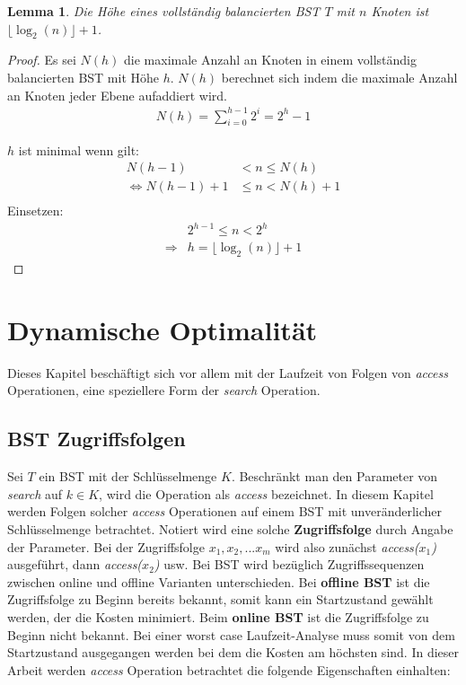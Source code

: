 \documentclass[a4paper,12pt]{article}
\begin{document}
\newtheorem{Lemma}{Lemma}[section]
\begin{Lemma} Die Höhe eines vollständig balancierten BST $T$ mit $n$ Knoten ist $ \lfloor \log_2{(n)} \rfloor + 1 $. 
\end{Lemma}
\begin{proof}
	
	Es sei $\mathit{N(h)}$ die maximale Anzahl an Knoten in einem vollständig balancierten BST mit Höhe $h$.
	$\mathit{N(h)}$  berechnet sich indem die maximale Anzahl an Knoten jeder Ebene aufaddiert wird.\\
	\begin{align*}
	\mathit{N(h)} = \sum\limits_{i=0}^{h-1} 2^i = 2^h - 1 
	\end{align*}
	
	\noindent	$h$ ist minimal wenn gilt:\\
	\begin{align*}
	\mathit{N(h-1)} &< n \leq \mathit{N(h)}\\
	\Leftrightarrow \mathit{N(h-1)} + 1 &\leq n < \mathit{N(h)} + 1\\
	\end{align*}
	Einsetzen:\\
	\begin{align*}
	&2^{h - 1} \leq n < 2^h\\
	\Rightarrow & h =  \lfloor \log_2{(n)} \rfloor + 1
	\end{align*}
	
\end{proof}


\newpage
\section{Dynamische Optimalität}
Dieses Kapitel beschäftigt sich vor allem mit der Laufzeit von Folgen von \textit{access} Operationen, eine speziellere Form der \textit{search} Operation.  
\subsection{BST Zugriffsfolgen}
Sei $T$ ein BST mit der Schlüsselmenge $K$. Beschränkt man den Parameter von \textit{search} auf $k \in K $, wird  die Operation als \textit{access} bezeichnet. In diesem Kapitel werden Folgen solcher \textit{access} Operationen auf einem BST mit unveränderlicher Schlüsselmenge betrachtet. Notiert wird eine solche \textbf{Zugriffsfolge} durch Angabe der Parameter. Bei der Zugriffsfolge $x_1,x_2,...x_m$ wird also zunächst \textit{access($x_1$)} ausgeführt, dann \textit{access($x_2$)} usw.  Bei BST wird bezüglich Zugriffssequenzen zwischen online und offline Varianten unterschieden. Bei \textbf{offline BST} ist die Zugriffsfolge zu Beginn bereits bekannt, somit kann ein Startzustand gewählt werden, der die Kosten minimiert. Beim \textbf{online BST} ist die Zugriffsfolge zu Beginn nicht bekannt. Bei einer worst case Laufzeit-Analyse muss somit von dem Startzustand ausgegangen werden bei dem die Kosten am höchsten sind.
In dieser Arbeit werden \textit{access} Operation betrachtet die folgende Eigenschaften einhalten:
\end{document}
